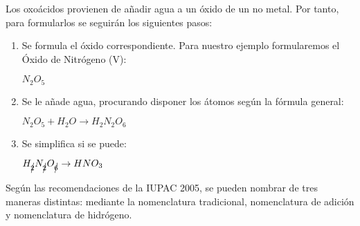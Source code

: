 \documentclass[11pt,fleqn]{book} %
\begin{document}
Los oxoácidos provienen de añadir agua a un óxido de un no metal. Por tanto, para formularlos se seguirán los siguientes pasos:\\
\begin{enumerate}
	\item Se formula el óxido correspondiente. Para nuestro ejemplo formularemos el Óxido de Nitrógeno (V):
	\begin{center}
		$N_{2}O_5$
	\end{center}
	\item Se le añade agua, procurando disponer los átomos según la fórmula general:
	\begin{center}
		$N_{2}O_5+ H_{2}O \rightarrow H_{2}N_{2}O_6$	
	\end{center}
	\item Se simplifica si se puede:
	\begin{center}
		$H_{\cancel{2}}N_{\cancel{2}}O_{\cancel{6}} \rightarrow HNO_3$
	\end{center}
\end{enumerate}
Según las recomendaciones de la IUPAC 2005, se pueden nombrar de tres maneras distintas: mediante la nomenclatura tradicional, nomenclatura de adición y nomenclatura de hidrógeno.\\
\end{document}
